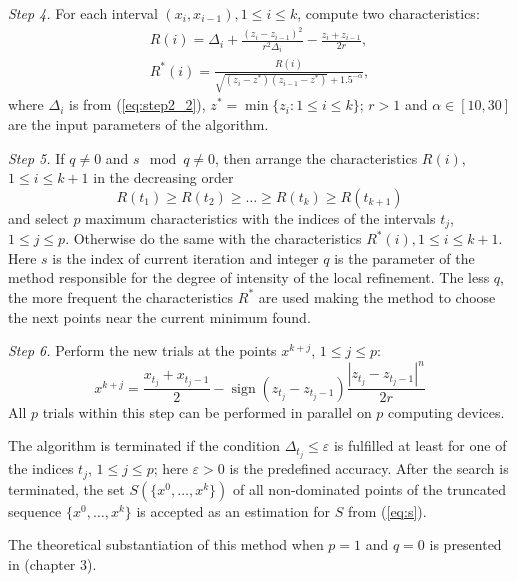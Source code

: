 \documentclass{llncs}
\DeclareMathOperator{\sign}{sign}
\begin{document}
\textit{Step 4.} For each interval \((x_i,x_{i-1}),1\leqslant i\leqslant k\), compute two
characteristics:
\begin{eqnarray}
  R(i) = \Delta_i + \frac{(z_i-z_{i-1})^2}{r^2\Delta_i}-\frac{z_i+z_{i-1}}{2r}, \\
  R^*(i)=\frac{R(i)}{\sqrt{(z_i-z^*)(z_{i-1}-z^*)} + 1.5^{-\alpha}},
\end{eqnarray}
where \(\Delta_i\) is from (\ref{eq:step2_2}), \(z^*=\min\{z_i:1\leqslant i\leqslant k\}\); \(r>1\) and
\(\alpha\in [10,30]\) are the input parameters of the algorithm.

\textit{Step 5.} If \(q\not=0\) and \(s \mod q\not=0 \), then arrange the characteristics \(R(i)\),
\(1 \leqslant i \leqslant k + 1\) in the decreasing order
\begin{equation*}
  R(t_1) \geqslant R(t_2) \geqslant \dots \geqslant R(t_k) \geqslant R(t_{k+1})
\end{equation*}
and select \(p\) maximum characteristics with the indices of the intervals \(t_j\), \(1 \leqslant j
\leqslant p\). Otherwise do the same with the characteristics \(R^*(i),1\leqslant i\leqslant k+1\).
Here \(s\) is the index of current iteration and integer \(q\) is the parameter of the method responsible
for the degree of intensity of the local refinement. The less \(q\), the more frequent the
characteristics \(R^*\) are used making the method to choose the next points near the current
minimum found.

\textit{Step 6.} Perform the new trials at the points \(x^{k+j}\), \(1 \leqslant j \leqslant p\):
\begin{equation}
  x^{k+j}=\frac{x_{t_j}+x_{t_j-1}}{2} - \sign(z_{t_j} - z_{t_j-1})\frac{|z_{t_j} - z_{t_j-
1}|^n}{2r}
\end{equation}
All \(p\) trials within this step can be performed in parallel on \(p\) computing devices.

The algorithm is terminated if the condition \(\Delta_{t_j}\leqslant \varepsilon\) is fulfilled at
least for one of the indices \(t_j\), \(1\leqslant j\leqslant p\); here \(\varepsilon >0\) is the
predefined accuracy.
After the search is terminated, the set \(S(\{x^0,\dots ,x^k\})\) of all
non-dominated points of the truncated sequence \(\{x^0,\dots ,x^k\}\) is accepted as an
estimation for \(S\) from (\ref{eq:s}).

The theoretical substantiation of this method when \(p=1\) and \(q=0\) is presented in
\cite{strOptBook}(chapter 3). 
\end{document}
